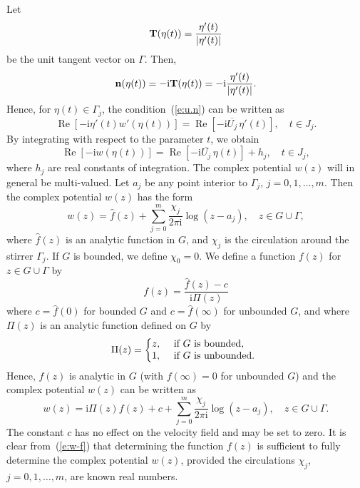 \documentclass[11pt,a4paper]{article}
\renewcommand{\Re}{\mathop{\mathrm{Re}}}
\renewcommand{\i}{\mathrm{i}}
\renewcommand{\Re}{\mathop{\mathrm{Re}}}
\renewcommand{\i}{\mathrm{i}}
\newcommand{\bn}{{\bf n}}
\newcommand{\bT}{{\bf T}}
\begin{document}
Let 
\[
\bT(\eta(t))=\frac{\eta'(t)}{|\eta'(t)|}
\] 
be the unit tangent vector on $\Gamma$. Then,
\[
\bn(\eta(t))=-\i\bT(\eta(t))=-\i\frac{\eta'(t)}{|\eta'(t)|}.
\]
Hence, for $\eta(t)\in\Gamma_j$, the condition~(\ref{e:u.n}) can be written as
\begin{equation}\label{e:w'-cd}
\Re[-\i\eta'(t)w'(\eta(t))]=\Re[-\i\overline{U_j}\,\eta'(t)], \quad t\in J_j. 
\end{equation}
By integrating with respect to the parameter $t$, we obtain~\cite{cro-str}
\begin{equation}\label{e:w-cd}
\Re[-\i w(\eta(t))]=\Re[-\i\overline{U_j}\,\eta(t)]+h_j, \quad t\in J_j,  
\end{equation}
where $h_j$ are real constants of integration. 
The complex potential $w(z)$ will in general be multi-valued.
Let $a_j$ be any point interior to $\Gamma_j$, $j=0,1,\ldots,m$. Then the complex potential $w(z)$ has the form
\begin{equation}\label{e:w-hf}
w(z)=\hat f(z)+\sum_{j=0}^m \frac{\chi_j}{2\pi\i}\log(z-a_j), \quad z\in G\cup\Gamma,
\end{equation}
where $\hat f(z)$ is an analytic function in $G$, and $\chi_j$ is the circulation around the stirrer $\Gamma_j$. If $G$ is bounded, we define $\chi_0=0$. We define a function $f(z)$ for $z\in G\cup\Gamma$ by
\begin{equation}\label{e:f-hf}
f(z)=\frac{\hat f(z)-c}{\i\Pi(z)}
\end{equation}
where
$c=\hat f(0)$ for bounded $G$ and $c=\hat f(\infty)$ for unbounded $G$, and where $\Pi(z)$ is an analytic function defined on $G$ by
\begin{equation}\label{e:Pi}
\Pi(z) = \left\{
\begin{array}{@{}l@{\hspace{0.5cm}}l}
z,& \mbox{if $G$ is bounded},\\
1,         & \mbox{if $G$ is unbounded}. \\
\end{array}%
\right.
\end{equation}
Hence, $f(z)$ is analytic in $G$ (with $f(\infty)=0$ for unbounded $G$) and the complex potential $w(z)$ can be written as
\begin{equation}\label{e:w-f}
w(z)=\i\Pi(z)f(z)+c+\sum_{j=0}^m \frac{\chi_j}{2\pi\i}\log(z-a_j), \quad z\in G\cup\Gamma.
\end{equation}
The constant $c$ has no effect on the velocity field and may be set to zero. It is clear from~(\ref{e:w-f}) that determining the function $f(z)$ is sufficient to fully determine the complex potential $w(z)$, provided the circulations $\chi_j$, $j=0,1,\ldots,m$, are known real numbers. 
\end{document}
